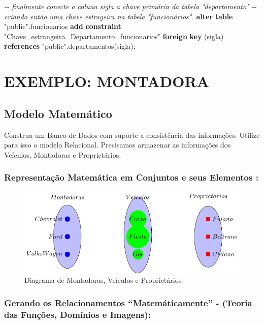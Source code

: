 \documentclass[
]{book}
\newenvironment{Shaded}{\begin{snugshade}}{\end{snugshade}}
\newcommand{\CommentTok}[1]{\textcolor[rgb]{0.56,0.35,0.01}{\textit{#1}}}
\newcommand{\KeywordTok}[1]{\textcolor[rgb]{0.13,0.29,0.53}{\textbf{#1}}}
\newcommand{\NormalTok}[1]{#1}
\newcommand{\OtherTok}[1]{\textcolor[rgb]{0.56,0.35,0.01}{#1}}
\begin{document}
\begin{Shaded}
\begin{Highlighting}[]
\CommentTok{{-}{-} finalmente conecte a coluna sigla a chave primária da tabela "departamento"}
\CommentTok{{-}{-} criando então uma chave estrageira na tabela "funcionários".}
\KeywordTok{alter} \KeywordTok{table} \OtherTok{"public"}\NormalTok{.funcionarios }\KeywordTok{add} \KeywordTok{constraint} \OtherTok{"Chave\_estrangeira\_Departamento\_funcionarios"} \KeywordTok{foreign} \KeywordTok{key}\NormalTok{ (sigla) }\KeywordTok{references} \OtherTok{"public"}\NormalTok{.departamentos(sigla);}
\end{Highlighting}
\end{Shaded}

\section{EXEMPLO: MONTADORA}\label{exemplo-montadora}

\subsection{Modelo Matemático}\label{modelo-matemuxe1tico}

Construa um Banco de Dados com suporte a consistência das informações. Utilize para isso o modelo Relacional. Precisamos armazenar as informações dos Veículos, Montadoras e Proprietários;

\subsubsection{Representação Matemática em Conjuntos e seus Elementos :}\label{representauxe7uxe3o-matemuxe1tica-em-conjuntos-e-seus-elementos}

\begin{figure}
\centering
\includegraphics{2025-GTI-Sem-BancoDeDados_files/figure-latex/tikz-diagrama1-1.pdf}
\caption{\label{fig:tikz-diagrama1}Diagrama de Montadoras, Veículos e Proprietários}
\end{figure}

\subsubsection{Gerando os Relacionamentos ``Matemáticamente'' - (Teoria das Funções, Domínios e Imagens):}\label{gerando-os-relacionamentos-matemuxe1ticamente---teoria-das-funuxe7uxf5es-domuxednios-e-imagens}
\end{document}
